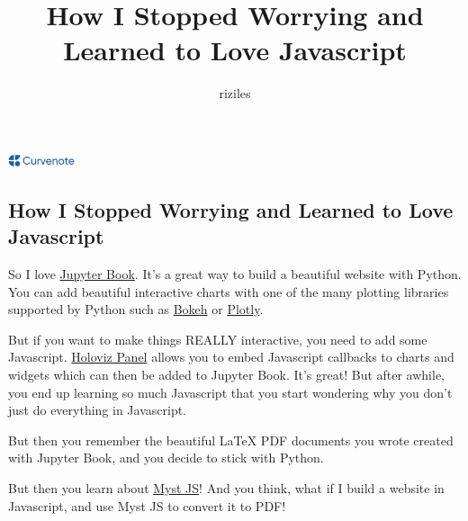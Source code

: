 \documentclass{article}
\title{How I Stopped Worrying and Learned to Love Javascript}
\author{riziles}
\date{\displaydate{articleDate}}
\newcommand{\logo}{
  \href{https://curvenote.com}{\includegraphics[width=2cm]{curvenote.png}}
}
\begin{document}
\maketitle
\begin{center}\logo\end{center}


\subsection*{How I Stopped Worrying and Learned to Love Javascript}

So I love \href{https://jupyterbook.org/en/stable/start/your-first-book.html}{Jupyter Book}.
It's a great way to build a beautiful website with Python.
You can add beautiful interactive charts with one of the many plotting libraries supported by Python
such as \href{https://bokeh.org/}{Bokeh} or \href{https://plotly.com/python/}{Plotly}.

But if you want to make things REALLY interactive, you need to add some Javascript.
\href{https://panel.holoviz.org/user_guide/Links.html#defining-javascript-callbacks}{Holoviz Panel}
allows you to embed Javascript callbacks to charts and widgets which
can then be added to Jupyter Book. It's great! But after awhile, you end up learning so
much Javascript that you start wondering why you don't just do everything in Javascript.

But then you remember the beautiful LaTeX PDF documents you wrote created with Jupyter Book,
and you decide to stick with Python.

But then you learn about \href{https://myst-tools.org/docs/mystjs}{Myst JS}! And you think,
what if I build a website in Javascript, and use Myst JS to convert it to PDF!



\end{document}
